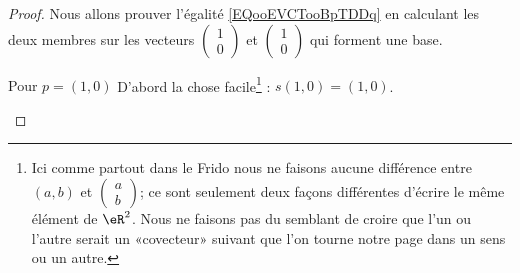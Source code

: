 \begin{proof}
    Nous allons prouver l'égalité \eqref{EQooEVCTooBpTDDq} en calculant les deux membres sur les vecteurs \( \begin{pmatrix}
        1    \\ 
        0    
    \end{pmatrix}\) et \( \begin{pmatrix}
        1    \\ 
        0    
    \end{pmatrix}\) qui forment une base.

    \begin{subproof}
        \item[Pour \( p=(1,0)\)]
            D'abord la chose facile\footnote{Ici comme partout dans le Frido nous ne faisons aucune différence entre \( (a,b)\) et \( \begin{pmatrix}
            a    \\ 
        b    
    \end{pmatrix}\); ce sont seulement deux façons différentes d'écrire le même élément de \( \eR^2\). Nous ne faisons pas du semblant de croire que l'un ou l'autre serait un «covecteur» suivant que l'on tourne notre page dans un sens ou un autre.} : \( s(1,0)=(1,0)\).


\end{subproof}
\end{proof}
